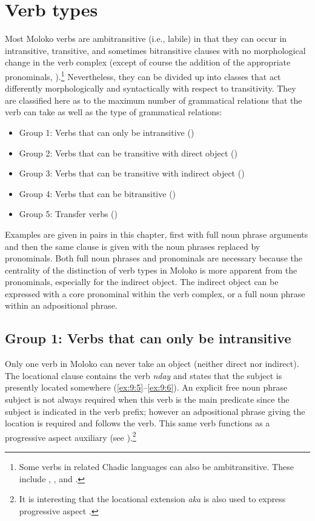 \section{Verb types}\label{sec:9.2}
\hypertarget{RefHeading1212661525720847}{}
Most Moloko verbs are ambitransitive (i.e., labile) in that they can occur in intransitive, transitive, and sometimes bitransitive clauses with no morphological change in the verb complex (except of course the addition of the appropriate pronominals, ).\footnote{Some verbs in related Chadic languages can also be ambitransitive. These include  \citep{Ndokobai2006},   \citep{Viljoen2013}, and  \citep{Kinnaird2006}.} Nevertheless, they can be divided up into classes that act differently morphologically and syntactically with respect to transitivity. They are classified here as to the maximum number of grammatical relations that the verb can take as well as the type of grammatical relations: %

\largerpage
\begin{itemize}
\item Group 1: Verbs that can only be intransitive ()
\item Group 2: Verbs that can be transitive with direct object ()
\item Group 3: Verbs that can be transitive with indirect object ()
\item Group 4: Verbs that can be bitransitive ()
\item Group 5: Transfer verbs ()
\end{itemize}

Examples are given in pairs in this chapter, first with full noun phrase arguments and then the same clause is given with the noun phrases replaced by pronominals. Both full noun phrases and pronominals are necessary because the centrality of the distinction of verb types in Moloko is more apparent from the pronominals, especially for the indirect object. The indirect object can be expressed with a core pronominal within the verb complex, or a full noun phrase within an adpositional phrase. 

\subsection{Group 1: Verbs that can only be intransitive}\label{sec:9.2.1}
\hypertarget{RefHeading1212681525720847}{}
Only one verb in Moloko can never take an object (neither direct nor indirect). The locational clause contains the verb \textit{nday} and states that the subject is presently located somewhere (\ref{ex:9:5}--\ref{ex:9:6}). An explicit free noun phrase subject is not always required when this verb is the main predicate since the subject is indicated in the verb prefix; however an adpositional phrase giving the location is required and follows the verb. This same verb functions as a progressive aspect auxiliary (see ).\footnote{It is interesting that the locational extension \textit{aka} is also used to express progressive aspect .}


